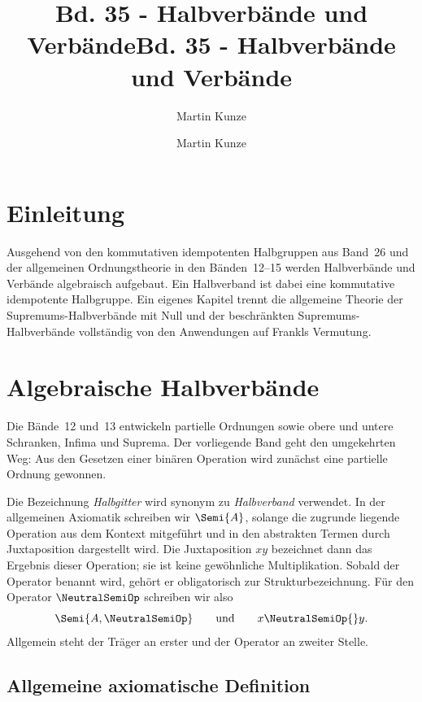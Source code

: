 \documentclass[main.tex]{subfiles}
\title{Bd. 35 - Halbverbände und Verbände}
\author{Martin Kunze}
\date{}
\begin{document}
\title{Bd. 35 - Halbverbände und Verbände}
\author{Martin Kunze}
\date{}
\hypersetup{pageanchor=false}
\maketitle
\hypersetup{pageanchor=true}
\setcounter{tocdepth}{3}
\tableofcontents
\setcounter{file}{35}
\renewcommand{\FormulaBandID}{35}
\newcommand{\ProofRefStack}[1]{%
  \ensuremath{\begin{gathered}#1\end{gathered}}}

\chapter{Einleitung}

Ausgehend von den kommutativen idempotenten Halbgruppen aus Band~26 und der allgemeinen Ordnungstheorie
in den Bänden~12--15 werden Halbverbände und Verbände algebraisch aufgebaut. Ein
Halbverband ist dabei eine kommutative idempotente Halbgruppe. Ein eigenes
Kapitel trennt
die allgemeine Theorie der Supremums-Halbverbände mit Null und der
beschränkten Supremums-Halbverbände vollständig von den Anwendungen auf
Frankls Vermutung.

\chapter{Algebraische Halbverbände}

Die Bände~12 und~13 entwickeln partielle Ordnungen sowie obere und untere Schranken,
Infima und Suprema. Der vorliegende Band geht den umgekehrten Weg: Aus den
Gesetzen einer binären Operation wird zunächst eine partielle Ordnung
gewonnen.

Die Bezeichnung \emph{Halbgitter} wird synonym zu \emph{Halbverband}
verwendet. In der allgemeinen Axiomatik schreiben wir \(\Semi{A}\), solange
die zugrunde liegende Operation aus dem Kontext mitgeführt und in den
abstrakten Termen durch Juxtaposition dargestellt wird. Die Juxtaposition
\(xy\) bezeichnet dann das Ergebnis dieser Operation; sie ist keine
gewöhnliche Multiplikation. Sobald der Operator benannt wird, gehört er
obligatorisch zur Strukturbezeichnung. Für den Operator \(\NeutralSemiOp\)
schreiben wir also
\[
  \Semi{A,\NeutralSemiOp}
  \qquad\text{und}\qquad
  x\NeutralSemiOp{}y.
\]
Allgemein steht der Träger an erster und der Operator an zweiter Stelle.

\section{Allgemeine axiomatische Definition}
\end{document}
